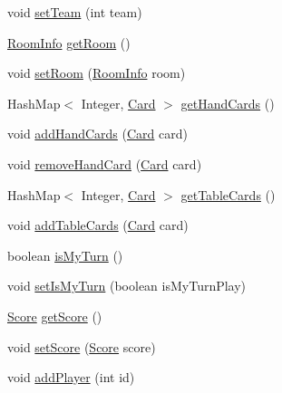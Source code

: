 \begin{DoxyCompactItemize}
\item 
void \mbox{\hyperlink{classClient_1_1Model_1_1InstanceModel_a7a6b8e1bf99e71a855e91dbd3b79ef21}{set\+Team}} (int team)
\item 
\mbox{\hyperlink{classCommon_1_1RoomInfo}{Room\+Info}} \mbox{\hyperlink{classClient_1_1Model_1_1InstanceModel_a6f42d7fdb1ff144f4dac43d286db3515}{get\+Room}} ()
\item 
void \mbox{\hyperlink{classClient_1_1Model_1_1InstanceModel_ad383951ca582c2b93e56cab76da7a50d}{set\+Room}} (\mbox{\hyperlink{classCommon_1_1RoomInfo}{Room\+Info}} room)
\item 
Hash\+Map$<$ Integer, \mbox{\hyperlink{classCommon_1_1Card}{Card}} $>$ \mbox{\hyperlink{classClient_1_1Model_1_1InstanceModel_ab9869708057146636b1773389c1ff58b}{get\+Hand\+Cards}} ()
\item 
void \mbox{\hyperlink{classClient_1_1Model_1_1InstanceModel_a8a2f49da7c74662a49caf91450d53e3e}{add\+Hand\+Cards}} (\mbox{\hyperlink{classCommon_1_1Card}{Card}} card)
\item 
void \mbox{\hyperlink{classClient_1_1Model_1_1InstanceModel_a3b6a2963467530846c5176b3c74d14ed}{remove\+Hand\+Card}} (\mbox{\hyperlink{classCommon_1_1Card}{Card}} card)
\item 
Hash\+Map$<$ Integer, \mbox{\hyperlink{classCommon_1_1Card}{Card}} $>$ \mbox{\hyperlink{classClient_1_1Model_1_1InstanceModel_a96126216a891878666841d1cad7f2efa}{get\+Table\+Cards}} ()
\item 
void \mbox{\hyperlink{classClient_1_1Model_1_1InstanceModel_aafa39746b9d039592d4c68e201ac1016}{add\+Table\+Cards}} (\mbox{\hyperlink{classCommon_1_1Card}{Card}} card)
\item 
boolean \mbox{\hyperlink{classClient_1_1Model_1_1InstanceModel_a355194b190bd46f5d32471adfc7a73c4}{is\+My\+Turn}} ()
\item 
void \mbox{\hyperlink{classClient_1_1Model_1_1InstanceModel_a10f6f136d3f04b9c9c2df29de44cd9fc}{set\+Is\+My\+Turn}} (boolean is\+My\+Turn\+Play)
\item 
\mbox{\hyperlink{classClient_1_1Model_1_1Score}{Score}} \mbox{\hyperlink{classClient_1_1Model_1_1InstanceModel_a80042ebca2c9a690878aa98492f10d02}{get\+Score}} ()
\item 
void \mbox{\hyperlink{classClient_1_1Model_1_1InstanceModel_aa22d40552433d341db0fdb8ae292004d}{set\+Score}} (\mbox{\hyperlink{classClient_1_1Model_1_1Score}{Score}} score)
\item 
void \mbox{\hyperlink{classClient_1_1Model_1_1InstanceModel_a33b1ff3d2c7e42af3faacd8204939889}{add\+Player}} (int id)

\end{DoxyCompactItemize}
